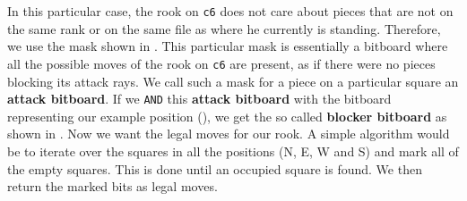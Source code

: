 In this particular case, the rook on \texttt{c6} does not care about pieces that are not on the same rank or on the same file as where he currently is standing.
Therefore, we use the mask shown in .
This particular mask is essentially a bitboard where all the possible moves of the rook on \texttt{c6} are present, as if there were no pieces blocking its attack rays. 
We call such a mask for a piece on a particular square an \textbf{attack bitboard}.
If we \texttt{AND} this \textbf{attack bitboard} with the bitboard representing our example position (), we get the so called \textbf{blocker bitboard} as shown in . 
Now we want the legal moves for our rook.
A simple algorithm would be to iterate over the squares in all the positions (N, E, W and S) and mark all of the empty squares.
This is done until an occupied square is found.
We then return the marked bits as legal moves.

